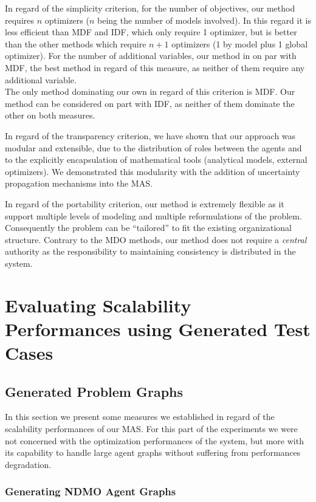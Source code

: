 In regard of the simplicity criterion, for the number of objectives, our method requires $n$ optimizers ($n$ being the number of models involved). In this regard it is less efficient than MDF and IDF, which only require 1 optimizer, but is better than the other methods which require $n+1$ optimizers (1 by model plus 1 global optimizer). For the number of additional variables, our method in on par with MDF, the best method in regard of this measure, as neither of them require any additional variable.\\
The only method dominating our own in regard of this criterion is MDF. Our method can be considered on part with IDF, as neither of them dominate the other on both measures.

In regard of the transparency criterion, we have shown that our approach was modular and extensible, due to the distribution of roles between the agents and to the explicitly encapsulation of mathematical tools (analytical models, external optimizers). We demonstrated this modularity with the addition of uncertainty propagation mechanisms into the MAS.

In regard of the portability criterion, our method is extremely flexible as it support multiple levels of modeling and multiple reformulations of the problem. Consequently the problem can be \enquote{tailored} to fit the existing organizational structure. Contrary to the MDO methods, our method does not require a \emph{central} authority as the responsibility to maintaining consistency is distributed in the system.

\chapter{Evaluating Scalability Performances using Generated Test Cases}

\section{Generated Problem Graphs}

In this section we present some measures we established in regard of the scalability performances of our MAS. For this part of the experiments we were not concerned with the optimization performances of the system, but more with its capability to handle large agent graphs without suffering from performances degradation.

\subsection{Generating NDMO Agent Graphs}

